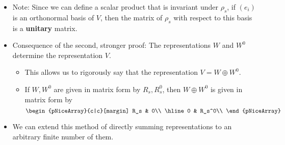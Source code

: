\documentclass[../notes.tex]{subfiles}
\begin{document}
\begin{itemize}
\begin{theorem}
        \begin{proof}[Proof 2 (orthogonal complement)]
            Let $W^0$ be the orthogonal complement of $W$, and endow $V$ with a \textbf{scalar product} $(x\mid y)$ to turn it into an inner product space. Replace $(x\mid y)$ with the new inner product $\sum_{t\in G}(\rho_tx\mid\rho_ty)$. Now, if it wasn't already, the inner product is invariant under $\rho_s$ for all $s$, i.e., for $s$ arbitrary, we have
            \begin{equation*}
                (\rho_sx\mid\rho_sy) = (x\mid y)
            \end{equation*}
            This means that vectors that were orthogonal before $\rho_s$ is applied to $V$, stay orthogonal after $\rho_s$ is applied to $V$. In particular, since $\rho_s$ preserves $W$ by hypothesis, all vectors orthogonal to $W$ (i.e., all vectors in $W^0$) stay orthogonal to $W$ (i.e., stay in $W^0$) after $\rho_s$ is applied. Thus, $W^0$ is stable under $\rho_s$ as well.
        \end{proof}
    \end{theorem}
    \item Note: Since we can define a scalar product that is invariant under $\rho_s$, if $(e_i)$ is an orthonormal basis of $V$, then the matrix of $\rho_s$ with respect to this basis is a \textbf{unitary} matrix.
    \item Consequence of the second, stronger proof: The representations $W$ and $W^0$ determine the representation $V$.
    \begin{itemize}
        \item This allows us to rigorously say that the representation $V=W\oplus W^0$.
        \item If $W,W^0$ are given in matrix form by $R_s,R_s^0$, then $W\oplus W^0$ is given in matrix form by
        \begin{equation*}
            \begin{pNiceArray}{c|c}[margin]
                R_s & 0\\
                \hline
                0 & R_s^0\\
            \end{pNiceArray}
        \end{equation*}
    \end{itemize}
    \item We can extend this method of directly summing representations to an arbitrary finite number of them.
\end{itemize}
\end{document}
